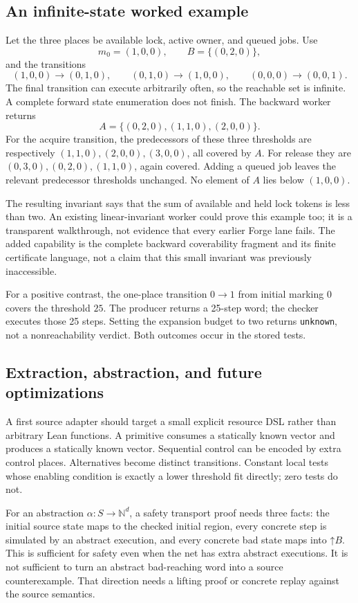 \documentclass[11pt,a4paper]{article}
\theoremstyle{definition}\newtheorem{definition}[theorem]{Definition}
\theoremstyle{remark}\newtheorem{remark}[theorem]{Remark}
\newcommand{\N}{\mathbb N}\newcommand{\Q}{\mathbb Q}\newcommand{\R}{\mathbb R}
\newcommand{\up}[1]{\mathord{\uparrow}#1}
\newcommand{\code}[1]{\nolinkurl{#1}}
\begin{document}
\subsection{An infinite-state worked example}
Let the three places be available lock, active owner, and queued jobs. Use
\[
 m_0=(1,0,0),\qquad B=\{(0,2,0)\},
\]
and the transitions
\[
 (1,0,0)\to(0,1,0),\qquad
 (0,1,0)\to(1,0,0),\qquad
 (0,0,0)\to(0,0,1).
\]
The final transition can execute arbitrarily often, so the reachable set is infinite. A complete forward state enumeration does not finish. The backward worker returns
\[
 A=\{(0,2,0),(1,1,0),(2,0,0)\}.
\]
For the acquire transition, the predecessors of these three thresholds are respectively $(1,1,0),(2,0,0),(3,0,0)$, all covered by $A$. For release they are $(0,3,0),(0,2,0),(1,1,0)$, again covered. Adding a queued job leaves the relevant predecessor thresholds unchanged. No element of $A$ lies below $(1,0,0)$.

The resulting invariant says that the sum of available and held lock tokens is less than two. An existing linear-invariant worker could prove this example too; it is a transparent walkthrough, not evidence that every earlier Forge lane fails. The added capability is the complete backward coverability fragment and its finite certificate language, not a claim that this small invariant was previously inaccessible.

For a positive contrast, the one-place transition $0\to1$ from initial marking $0$ covers the threshold $25$. The producer returns a 25-step word; the checker executes those 25 steps. Setting the expansion budget to two returns \code{unknown}, not a nonreachability verdict. Both outcomes occur in the stored tests.

\subsection{Extraction, abstraction, and future optimizations}
A first source adapter should target a small explicit resource DSL rather than arbitrary Lean functions. A primitive consumes a statically known vector and produces a statically known vector. Sequential control can be encoded by extra control places. Alternatives become distinct transitions. Constant local tests whose enabling condition is exactly a lower threshold fit directly; zero tests do not.

For an abstraction $\alpha:S\to\N^d$, a safety transport proof needs three facts: the initial source state maps to the checked initial region, every concrete step is simulated by an abstract execution, and every concrete bad state maps into $\up B$. This is sufficient for safety even when the net has extra abstract executions. It is not sufficient to turn an abstract bad-reaching word into a source counterexample. That direction needs a lifting proof or concrete replay against the source semantics.
\end{document}
